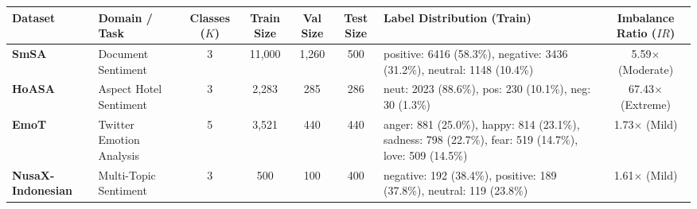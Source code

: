 \begin{tabularx}{\textwidth}{l l c c c c >{\raggedright\arraybackslash}X c}
\toprule
\textbf{Dataset} & \textbf{Domain / Task} & \textbf{Classes ($K$)} & \textbf{Train Size} & \textbf{Val Size} & \textbf{Test Size} & \textbf{Label Distribution (Train)} & \textbf{Imbalance Ratio ($IR$)} \\
\midrule
\textbf{SmSA} & Document Sentiment & 3 & 11,000 & 1,260 & 500 & positive: 6416 (58.3\%), negative: 3436 (31.2\%), neutral: 1148 (10.4\%) & 5.59$\times$ (Moderate) \\
\textbf{HoASA} & Aspect Hotel Sentiment & 3 & 2,283 & 285 & 286 & neut: 2023 (88.6\%), pos: 230 (10.1\%), neg: 30 (1.3\%) & 67.43$\times$ (Extreme) \\
\textbf{EmoT} & Twitter Emotion Analysis & 5 & 3,521 & 440 & 440 & anger: 881 (25.0\%), happy: 814 (23.1\%), sadness: 798 (22.7\%), fear: 519 (14.7\%), love: 509 (14.5\%) & 1.73$\times$ (Mild) \\
\textbf{NusaX-Indonesian} & Multi-Topic Sentiment & 3 & 500 & 100 & 400 & negative: 192 (38.4\%), positive: 189 (37.8\%), neutral: 119 (23.8\%) & 1.61$\times$ (Mild) \\
\bottomrule
\end{tabularx}